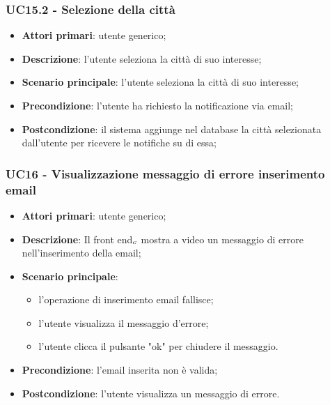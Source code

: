 \subsubsection{UC15.2 - Selezione della città}\label{CasiDUsoCasiDUsoFacoltativiTraUnUtenteEIlFrontEndElencoCasiDUsoUC15.2SelezioneCitta}

\begin{itemize}
	\item \textbf{Attori primari}: utente generico;
	\item \textbf{Descrizione}: l'utente seleziona la città di suo interesse;
	\item \textbf{Scenario principale}: l'utente seleziona la città di suo interesse;
	\item \textbf{Precondizione}: l'utente ha richiesto la notificazione via email;
	\item \textbf{Postcondizione}: il sistema aggiunge nel database la città selezionata dall'utente per ricevere le notifiche su di essa;
\end{itemize}


\subsubsection{UC16 - Visualizzazione messaggio di errore inserimento email}\label{CasiDUsoCasiDUsoFacoltativiTraUnUtenteEIlFrontEndElencoCasiDUsoUC16VisualizzazioneMessaggioDiErroreEmailErrata}

\begin{itemize}
	\item \textbf{Attori primari}: utente generico;
	\item \textbf{Descrizione}: Il front end$_{\scaleto{G}{3pt}}$ mostra a video un messaggio di errore nell'inserimento della email;
	\item \textbf{Scenario principale}: \begin{itemize}
		\item l'operazione di inserimento email fallisce;
		\item l'utente visualizza il messaggio d'errore;
		\item l'utente clicca il pulsante "ok" per chiudere il messaggio.
	\end{itemize}
	\item \textbf{Precondizione}: l'email inserita non è valida;
	\item \textbf{Postcondizione}: l'utente visualizza un messaggio di errore.
\end{itemize}




